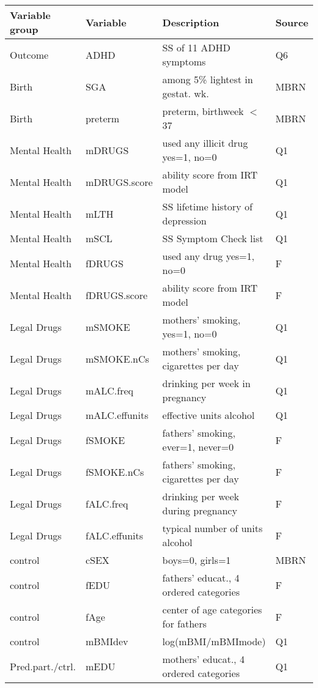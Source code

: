 \begin{table}[ph!]
	
\centering
\begin{tabular}{llll}
  \hline
  Variable group & Variable & Description & Source \\ 
  \hline
  Outcome & ADHD & SS of 11 ADHD symptoms & Q6 \\ 
  Birth & SGA & among 5\% lightest in gestat. wk. & MBRN \\ 
  Birth & preterm & preterm, birthweek $<$ 37 & MBRN \\
  Mental Health & mDRUGS & used any illicit drug yes=1, no=0 & Q1 \\ 
  Mental Health & mDRUGS.score & ability score from IRT model & Q1 \\ 
  Mental Health & mLTH & SS lifetime history of depression & Q1 \\ 
  Mental Health & mSCL & SS Symptom Check list & Q1 \\ 
  Mental Health & fDRUGS & used any drug yes=1, no=0 & F \\ 
  Mental Health & fDRUGS.score & ability score from IRT model & F \\ 
  Legal Drugs & mSMOKE & mothers' smoking, yes=1, no=0  & Q1 \\ 
  Legal Drugs & mSMOKE.nCs & mothers' smoking, cigarettes per day & Q1 \\
  Legal Drugs & mALC.freq & drinking per week in pregnancy & Q1 \\ 
  Legal Drugs & mALC.effunits & effective units alcohol & Q1 \\
  Legal Drugs & fSMOKE & fathers' smoking, ever=1, never=0 &  F \\ 
  Legal Drugs & fSMOKE.nCs & fathers' smoking, cigarettes per day &  F \\ 
  Legal Drugs & fALC.freq & drinking per week during pregnancy &  F \\   
  Legal Drugs & fALC.effunits & typical number of units alcohol &  F \\ 
  control & cSEX & boys=0, girls=1 & MBRN \\ 
  control & fEDU & fathers' educat., 4 ordered categories & F \\ 
  control & fAge & center of age categories for fathers & F \\ 
  control & mBMIdev & log(mBMI/mBMImode) & Q1 \\ 
  Pred.part./ctrl. & mEDU & mothers' educat., 4 ordered categories & Q1 \\ 

\end{tabular}
\end{table}
